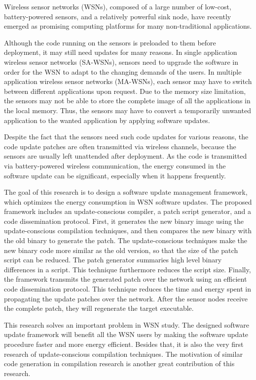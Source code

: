 Wireless sensor networks (WSNs), composed of a large number of low-cost, battery-powered sensors, and a relatively powerful sink node, have recently emerged as promising computing platforms for many non-traditional applications. 

Although the code running on the sensors is preloaded to them before deployment, it may still need updates for many reasons. 
In single application wireless sensor networks (SA-WSNs), sensors need to upgrade the software in order for the WSN to adapt to the changing demands of the users.
In multiple application wireless sensor networks (MA-WSNs), each sensor may have to switch between different applications upon request. Due to the memory size limitation, the sensors may not be able to store the complete image of all the applications in the local memory. 
Thus, the sensors may have to convert a temporarily unwanted application to the wanted application by applying software updates.

Despite the fact that the sensors need such code updates for various reasons, the code update patches are often transmitted via wireless channels, because the sensors are usually left unattended after deployment. As the code is transmitted via battery-powered wireless communication, the energy consumed in the software update can be significant, especially when it happens frequently.

The goal of this research is to design a software update management framework, which
optimizes the energy consumption in WSN software updates. The proposed framework
includes an update-conscious compiler, a patch script generator, and a code dissemination
protocol. First, it generates the new binary image using the update-conscious compilation
techniques, and then compares the new binary with the old binary to generate the patch.
The update-conscious techniques make the new binary code more similar as the old version,
so that the size of the patch script can be reduced. The patch generator summaries high
level binary differences in a script. This technique furthermore reduces the script size.
Finally, the framework transmits the generated patch over the network using an efficient code
dissemination protocol. This technique reduces the time and energy spent in propagating
the update patches over the network. After the sensor nodes receive the complete patch,
they will regenerate the target executable.

This research solves an important problem in WSN study. The designed software update framework will benefit all the WSN users by making the software update procedure faster and more energy efficient. Besides that, it is also the very first research of update-conscious compilation techniques. The motivation of similar code generation in compilation research is another great contribution of this research. 